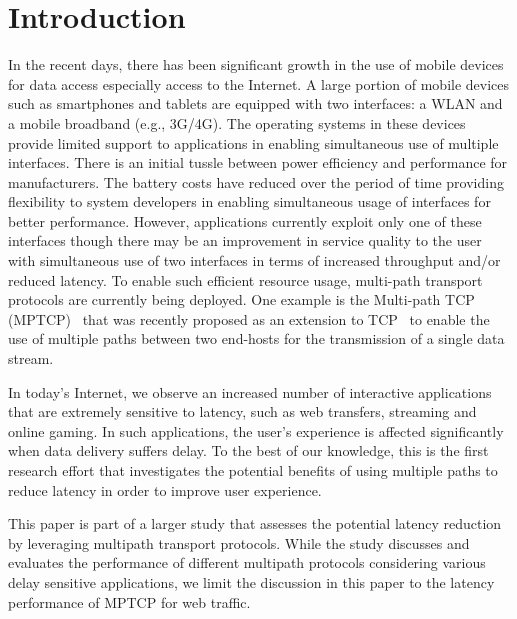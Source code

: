 \section{Introduction}
\label{sec:introduction}
In the recent days, there has been significant growth in the use of mobile devices for data access especially access to the Internet.
A large portion of mobile devices such as smartphones and tablets are equipped with two interfaces: a WLAN and a mobile broadband
(e.g., 3G/4G). The operating systems in these devices provide limited support to applications in enabling simultaneous use of
multiple interfaces. There is an initial tussle between power efficiency and performance for manufacturers. The battery costs
have reduced over the period of time providing flexibility to system developers in enabling simultaneous usage of interfaces for 
better performance. However, applications currently exploit only one of these interfaces though there may be an improvement in service
quality to the user with simultaneous use of two interfaces in terms of increased throughput and/or reduced latency. 
To enable such efficient resource usage, multi-path transport protocols are currently being deployed. 
One example is the Multi-path TCP (MPTCP)~\cite{RFC6824} that was recently proposed as an extension to
TCP~\cite{RFC793} to enable the use of multiple paths between two end-hosts for the transmission of a single data stream.

In today's Internet, we observe an increased number of interactive applications
that are extremely sensitive to latency, such as web transfers, streaming and online gaming. In such applications, the user's experience is affected significantly when data delivery suffers delay. 
To the best of our knowledge, this is the first research effort that investigates the potential benefits of using multiple paths to reduce latency in order to improve user experience.

This paper is part of a larger study that assesses the potential latency reduction by leveraging multipath transport protocols. While the study discusses and evaluates the performance of different multipath protocols considering various delay sensitive applications, we limit the discussion in this paper to the latency performance of MPTCP for web traffic.
